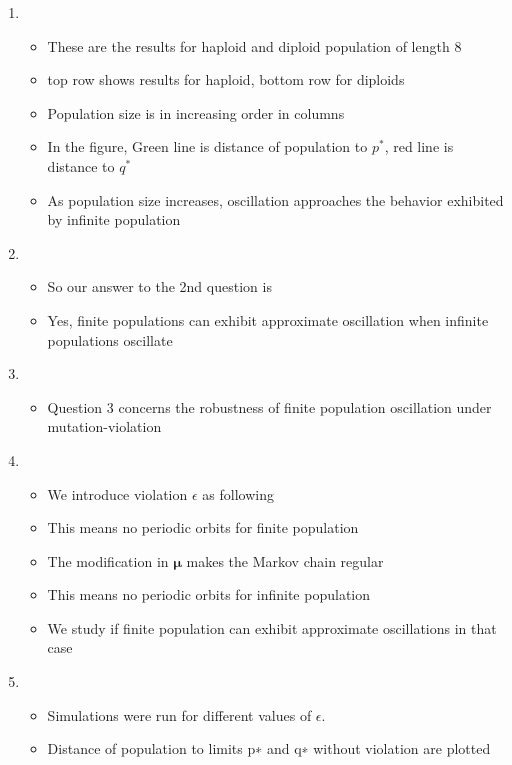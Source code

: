 \documentclass{article}
\begin{document}
\begin{enumerate}
\item
  \begin{itemize}
  \item These are the results for haploid and diploid population of
    length 8
   \item top row shows results for haploid, bottom row for diploids
  \item Population size is in increasing order in columns
  \item In the figure, Green line is distance of population to $p^\ast$, red line is distance to $q^\ast$
  \item As population size increases, oscillation approaches the
    behavior exhibited by infinite population
  \end{itemize}
    
    
\item
  \begin{itemize}
  \item So our answer to the 2nd question is
   \item Yes, finite populations can exhibit approximate oscillation when infinite populations oscillate
  \end{itemize}
  
\item
  \begin{itemize}
  \item Question 3 concerns the robustness of finite population oscillation under mutation-violation
  
  \end{itemize}

\item
  \begin{itemize}
  \item We introduce violation $\epsilon$ as following
  \item This means no periodic orbits for finite population
  \item The modification in $\bm{\mu}$ makes the Markov chain regular
  \item This means no periodic orbits for infinite population
  \item We study if finite population can exhibit approximate oscillations in that case 
  \end{itemize}
  
\item
  \begin{itemize}
  \item Simulations were run for different values of $\epsilon$.
  \item Distance of population to limits p∗ and q∗ without violation are plotted  
  \end{itemize}
  

\end{enumerate}
\end{document}
